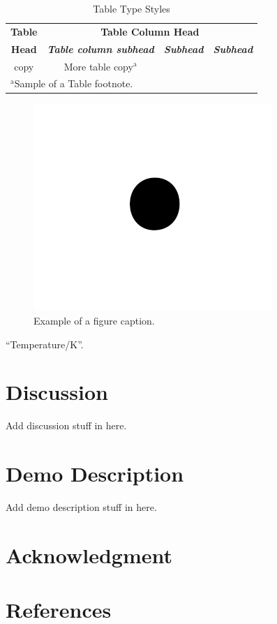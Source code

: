 \documentclass[conference]{IEEEtran}
\begin{document}
\begin{table}[htbp]
\caption{Table Type Styles}
\begin{center}
\begin{tabular}{|c|c|c|c|}
\hline
\textbf{Table}&\multicolumn{3}{|c|}{\textbf{Table Column Head}} \\
\cline{2-4} 
\textbf{Head} & \textbf{\textit{Table column subhead}}& \textbf{\textit{Subhead}}& \textbf{\textit{Subhead}} \\
\hline
copy& More table copy$^{\mathrm{a}}$& &  \\
\hline
\multicolumn{4}{l}{$^{\mathrm{a}}$Sample of a Table footnote.}
\end{tabular}
\label{tab1}
\end{center}
\end{table}

\begin{figure}[htbp]
\centerline{\includegraphics{fig1.png}}
\caption{Example of a figure caption.}
\label{fig}
\end{figure}

``Temperature/K''.
\section{Discussion}
Add discussion stuff in here.
\section{Demo Description} 
Add demo description stuff in here. 
\section*{Acknowledgment}

\section*{References}
\end{document}
